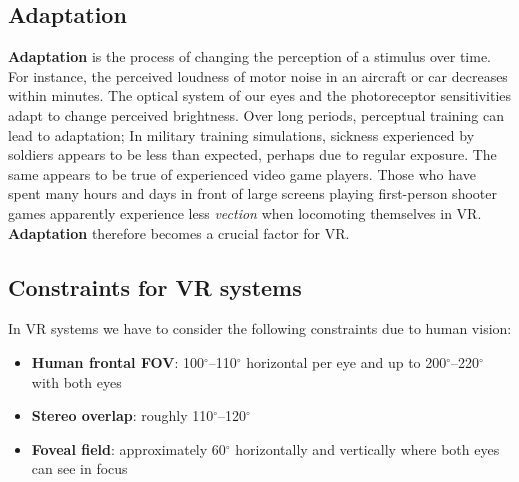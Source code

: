 \documentclass[11pt,a4paper]{article}
\theoremstyle{definition}
\theoremstyle{plain}
\theoremstyle{remark}
\begin{document}
\subsection{Adaptation}
\textbf{Adaptation} is the process of changing the perception of a stimulus over time.
For instance, the perceived loudness of motor noise in an aircraft or car decreases
within minutes.
The optical system of our eyes and the photoreceptor sensitivities
adapt to change perceived brightness.
Over long periods, perceptual training can lead to adaptation;
In military training simulations, sickness experienced by soldiers
appears to be less than expected, perhaps due to regular exposure.
The same appears to be true of experienced video game players. Those who have spent many hours and days in front of large screens
playing first-person shooter games apparently experience less
\textit{vection} when locomoting themselves in VR.
\textbf{Adaptation} therefore becomes a crucial factor for VR.


\subsection{Constraints for VR systems}
In VR systems we have to consider the following constraints due to human vision:
\begin{itemize}
    \item \textbf{Human frontal FOV}: 100$^\circ$--110$^\circ$ horizontal per eye and up to 200$^\circ$--220$^\circ$ with both eyes
    \item \textbf{Stereo overlap}: roughly 110$^\circ$--120$^\circ$
    \item \textbf{Foveal field}: approximately 60$^\circ$ horizontally and vertically where both eyes can see in focus
\end{itemize}
\end{document}
